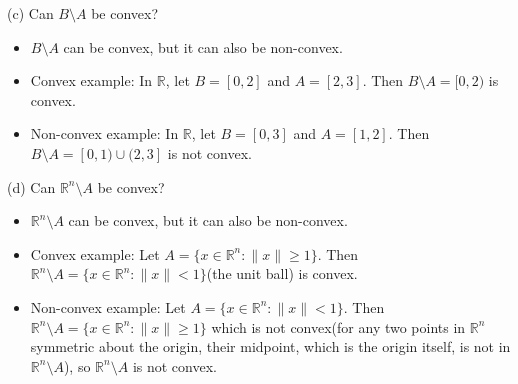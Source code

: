 \documentclass{article}
\begin{document}
(c) Can $B \setminus A$ be convex?
\begin{itemize}
\item $B \setminus A$ can be convex, but it can also be non-convex.
\item Convex example: In $\mathbb{R}$, let $B = [0,2]$ and $A = [2,3]$. Then $B \setminus A = [0,2)$ is convex.
\item Non-convex example: In $\mathbb{R}$, let $B = [0,3]$ and $A = [1,2]$. Then $B \setminus A = [0,1) \cup (2,3]$ is not convex.
\end{itemize}

(d) Can $\mathbb{R}^n \setminus A$ be convex?
\begin{itemize}
\item $\mathbb{R}^n \setminus A$ can be convex, but it can also be non-convex.
\item Convex example: Let $A = \{x \in \mathbb{R}^n : \|x\| \geq 1\}$. Then $\mathbb{R}^n \setminus A = \{x \in \mathbb{R}^n : \|x\| < 1\}$(the unit ball) is convex.
\item Non-convex example: Let $A = \{x \in \mathbb{R}^n : \|x\| < 1\}$. Then $\mathbb{R}^n \setminus A = \{x \in \mathbb{R}^n : \|x\| \geq 1\}$ which is not convex(for any two points in $\mathbb{R}^n$ symmetric about the origin, their midpoint, which is the origin itself, is not in $\mathbb{R}^n \setminus A$), so $\mathbb{R}^n \setminus A$ is not convex.
\end{itemize}
\end{document}
